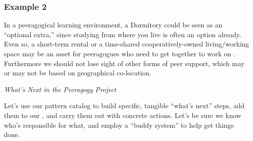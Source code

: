 \subsubsection*{Example 2}
In a peeragogical learning environment, a Dormitory could be seen as an ``optional extra,'' since studying from where you live is often an option already.  Even so, a short-term rental or a time-shared cooperatively-owned living\slash working space may be an asset for peeragogues who need to get together to work on .  Furthermore we should not lose sight of other forms of peer support, which may or may not be based on geographical co-location.


\begin{framed}
\noindent 
\emph{What's Next in the Peeragogy Project}
\begin{collectinmacro}{\SpecificWN}{}{}
Let's use our pattern catalog to build specific, tangible ``what's
next'' steps, add them to our , and carry them
out with concrete actions.  Let's be sure we know who's responsible
for what, and employ a ``buddy system'' to help get things done.
\end{collectinmacro}
\SpecificWN
\end{framed}

